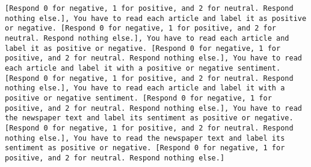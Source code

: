 \begin{lstlisting}[label=lst:poor_performing_prompts]
[Respond 0 for negative, 1 for positive, and 2 for neutral. Respond nothing else.], You have to read each article and label it as positive or negative. [Respond 0 for negative, 1 for positive, and 2 for neutral. Respond nothing else.], You have to read each article and label it as positive or negative. [Respond 0 for negative, 1 for positive, and 2 for neutral. Respond nothing else.], You have to read each article and label it with a positive or negative sentiment. [Respond 0 for negative, 1 for positive, and 2 for neutral. Respond nothing else.], You have to read each article and label it with a positive or negative sentiment. [Respond 0 for negative, 1 for positive, and 2 for neutral. Respond nothing else.], You have to read the newspaper text and label its sentiment as positive or negative. [Respond 0 for negative, 1 for positive, and 2 for neutral. Respond nothing else.], You have to read the newspaper text and label its sentiment as positive or negative. [Respond 0 for negative, 1 for positive, and 2 for neutral. Respond nothing else.]

\end{lstlisting}
